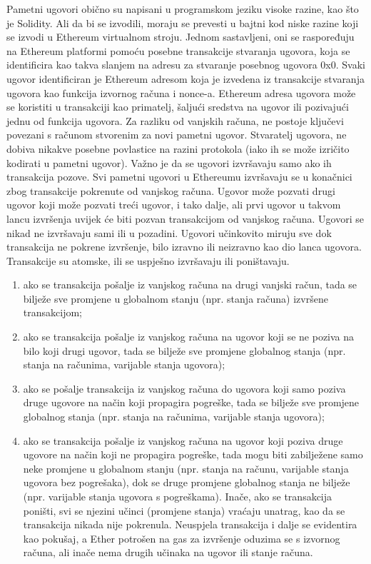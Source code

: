 \documentclass[times, utf8, diplomski]{fer}
\begin{document}
Pametni ugovori obično su napisani u programskom jeziku visoke razine, kao što je Solidity. Ali da bi se izvodili, moraju se prevesti u bajtni kod niske razine koji se izvodi u Ethereum virtualnom stroju. Jednom sastavljeni, oni se raspoređuju na Ethereum platformi pomoću posebne transakcije stvaranja ugovora, koja se identificira kao takva slanjem na adresu za stvaranje posebnog ugovora 0x0. Svaki ugovor identificiran je Ethereum adresom koja je izvedena iz transakcije stvaranja ugovora kao funkcija izvornog računa i nonce-a. Ethereum adresa ugovora može se koristiti u transakciji kao primatelj, šaljući sredstva na ugovor ili pozivajući jednu od funkcija ugovora. Za razliku od vanjskih računa, ne postoje ključevi povezani s računom stvorenim za novi
pametni ugovor. Stvaratelj ugovora, ne dobiva nikakve posebne povlastice na razini protokola (iako ih se može izričito kodirati u pametni ugovor).
Važno je da se ugovori izvršavaju samo ako ih transakcija pozove. Svi pametni ugovori u Ethereumu izvršavaju se u konačnici zbog transakcije pokrenute od vanjskog računa. Ugovor može pozvati drugi ugovor koji može pozvati treći ugovor, i tako dalje, ali prvi ugovor u takvom lancu izvršenja uvijek će biti pozvan transakcijom od vanjskog računa. Ugovori se nikad ne izvršavaju sami ili u pozadini. Ugovori učinkovito miruju sve dok transakcija ne pokrene izvršenje, bilo izravno ili neizravno kao dio lanca ugovora.  Transakcije su atomske,  ili se uspješno izvršavaju ili poništavaju. \cite{scTemplates}

\begin{enumerate}

\item ako se transakcija pošalje iz vanjskog računa na drugi vanjski račun, tada se bilježe sve promjene u globalnom stanju (npr. stanja računa) izvršene transakcijom;

\item ako se transakcija pošalje iz vanjskog računa na ugovor koji se ne poziva na bilo koji drugi ugovor, tada se bilježe sve promjene globalnog stanja (npr. stanja na računima, varijable stanja ugovora);

\item ako se pošalje transakcija iz vanjskog računa do ugovora koji samo poziva druge ugovore na način koji propagira pogreške, tada se bilježe sve promjene globalnog stanja (npr. stanja na računima, varijable stanja ugovora);

\item ako se transakcija pošalje iz vanjskog računa na ugovor koji poziva druge ugovore na način koji ne propagira pogreške, tada mogu biti zabilježene samo neke promjene u globalnom stanju (npr. stanja na računu, varijable stanja ugovora bez pogrešaka), dok se druge promjene globalnog stanja ne bilježe (npr. varijable stanja ugovora s pogreškama). Inače, ako se transakcija poništi, svi se njezini učinci (promjene stanja) vraćaju unatrag, kao da se transakcija nikada nije pokrenula. Neuspjela transakcija i dalje se evidentira kao pokušaj, a Ether potrošen na gas za izvršenje oduzima se s izvornog računa, ali inače nema drugih učinaka na ugovor ili stanje računa.

\end{enumerate}
\end{document}
